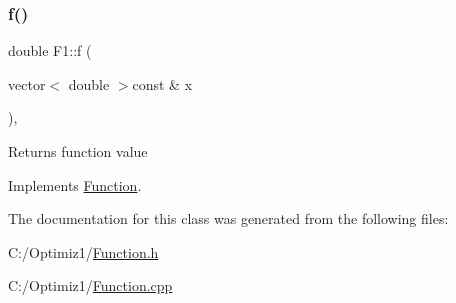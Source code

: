 \subsubsection{\texorpdfstring{f()}{f()}}
{\footnotesize\ttfamily double F1\+::f (\begin{DoxyParamCaption}\item[{vector$<$ double $>$const \&}]{x }\end{DoxyParamCaption})\hspace{0.3cm}{\ttfamily [override]}, {\ttfamily [virtual]}}

Returns function value 

Implements \hyperlink{class_function_ae9243748f484eb1135e55120fb0ccdea}{Function}.



The documentation for this class was generated from the following files\+:\begin{DoxyCompactItemize}
\item 
C\+:/\+Optimiz1/\hyperlink{_function_8h}{Function.\+h}\item 
C\+:/\+Optimiz1/\hyperlink{_function_8cpp}{Function.\+cpp}\end{DoxyCompactItemize}
